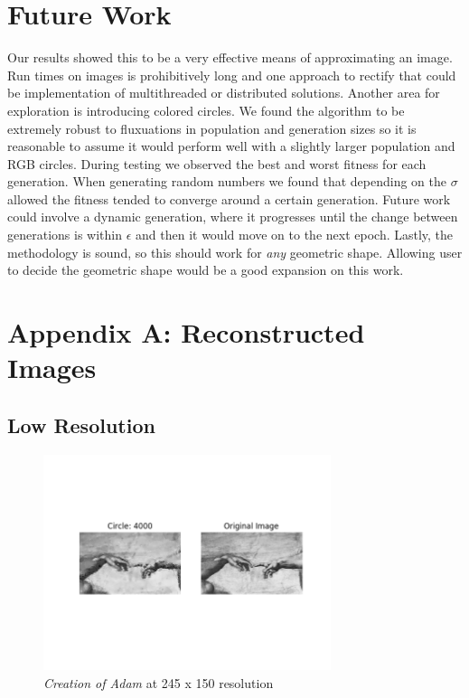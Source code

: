 \documentclass[12pt]{article}
\begin{document}
\section*{Future Work}
Our results showed this to be a very effective means of approximating an image. Run times on images is prohibitively long and one approach to rectify that could be implementation of multithreaded or distributed solutions. Another area for exploration is introducing colored circles. We found the algorithm to be extremely robust to fluxuations in population and generation sizes so it is reasonable to assume it would perform well with a slightly larger population and RGB circles. During testing we observed the best and worst fitness for each generation. When generating random numbers we found that depending on the $\sigma$ allowed the fitness tended to converge around a certain generation. Future work could involve a dynamic generation, where it progresses until the change between generations is within $\epsilon$ and then it would move on to the next epoch. Lastly, the methodology is sound, so this should work for \textit{any} geometric shape. Allowing user to decide the geometric shape would be a good expansion on this work.


\newpage
\section*{Appendix A: Reconstructed Images}

\subsection*{Low Resolution}
\begin{figure}[H]
\centering
\noindent\includegraphics[width=0.75\textwidth]{../results/adam/adam_4000}
\caption{\textit{Creation of Adam} at 245 x 150 resolution}
\end{figure}
\end{document}
